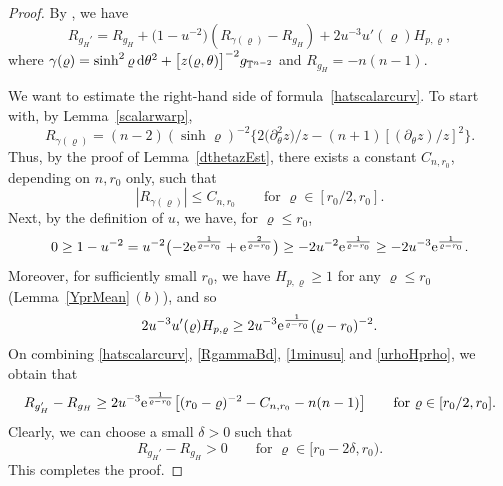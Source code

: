 \documentclass[10pt,a4paper]{amsart}
\numberwithin{equation}{section}
\def\T{\mathbb{T}}
\def\ed{{\rm d}}
\begin{document}
\begin{proof}


By \cite[Claim 2.1]{SWW2022}, we have
\begin{equation}\label{hatscalarcurv}
R_{g_H'}=R_{g_H}+\bigl(1-u^{-2}\bigr)(R_{\gamma(\varrho)}-R_{g_H})+2u^{-3}u'(\varrho) H_{p,\varrho},
\end{equation}
where
${\gamma(\varrho)}= \sinh^2 \varrho \,\ed\theta^2 +\bigl[z(\varrho,\theta)\bigr]^{-2}g_{\T^{n-2}}$ and $R_{g_H} = -n(n-1)$.

We want to estimate the right-hand side of formula~\eqref{hatscalarcurv}. To start with, by Lemma~\ref{scalarwarp},
\begin{equation*}%
R_{\gamma(\varrho)}= (n-2) (\sinh \varrho )^{-2}
\big\{2\big(\partial_\theta^2 z\big)/z -(n+1)[(\partial_\theta z)/z]^2\big\}.
\end{equation*}
Thus, by the proof of Lemma~\ref{dthetazEst}, there exists a constant $C_{n,r_0}$,
depending on $n,r_0$ only, such that
\begin{equation}\label{RgammaBd}
|R_{\gamma(\varrho)}|\leq C_{n,r_0}\qquad\mbox{for } \varrho \in [r_0/2, r_0].
\end{equation}
Next, by the definition of $u$, we have, for $\varrho\le r_0$,
\begin{equation}\label{1minusu}
	0\ge 1 - u^{-2} = u^{-2}\bigl(-2 {\rm e}^{\frac{1}{\varrho - r_0}} + {\rm e}^{\frac{2}{\varrho - r_0}}\bigr) \ge - 2u^{-2} {\rm e}^{\frac{1}{\varrho - r_0}} \ge -2u^{-3} {\rm e}^{\frac{1}{\varrho - r_0}} .
\end{equation}
Moreover, for sufficiently small $r_0$, we have
$H_{p,\varrho} \geq 1$ for any $\varrho\le r_0$ (Lemma~\ref{YprMean}\,$(b)$), and so
\begin{equation}\label{urhoHprho}
	2u^{-3} u'(\varrho) H_{p,\varrho}  \ge 2u^{-3} {\rm e}^{\frac{1}{\varrho - r_0}}(\varrho - r_0)^{-2}.
\end{equation}
On combining \eqref{hatscalarcurv}, \eqref{RgammaBd}, \eqref{1minusu}
and \eqref{urhoHprho}, we obtain that
\begin{equation*}%
	R_{g_H'} - R_{g_H} \ge 2u^{-3} {\rm e}^{\frac{1}{\varrho - r_0}}
	\bigl[(r_0 - \varrho)^{-2} - C_{n,r_0} - n(n-1)\bigr]\qquad\mbox{for } \varrho\in [r_0/2, r_0].
\end{equation*}
Clearly, we can choose a small $\delta>0$ such that
\begin{equation*}%
 R_{g_H'} - R_{g_H} >0 \qquad \mbox{for }
 \varrho \in [r_0-2\delta, r_0).
\end{equation*}
This completes the proof.
\end{proof}
\end{document}
